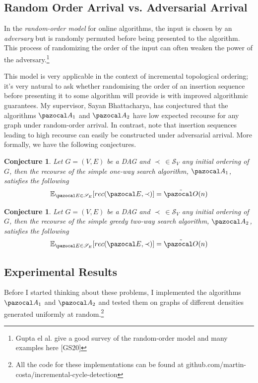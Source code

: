 \documentclass{report}
\newtheorem{conjecture}[theorem]{Conjecture}
\begin{document}
\subsection{Random Order Arrival vs. Adversarial Arrival}

In the \textit{random-order model} for online algorithms, the input is chosen by an \textit{adversary} but is randomly permuted before being presented to the algorithm. This process of randomizing the order of the input can often weaken the power of the adversary.\footnote{Gupta el al. give a good survey of the random-order model and many examples here [GS20]}

This model is very applicable in the context of incremental topological ordering; it's very natural to ask whether randomising the order of an insertion sequence before presenting it to some algorithm will provide is with improved algorithmic guarantees. My supervisor, Sayan Bhattacharya, has conjectured that the algorithms $\pazocal A_1$ and $\pazocal A_2$ have low expected recourse for any graph under random-order arrival. In contrast, note that insertion sequences leading to high recourse can easily be constructed under adversarial arrival. More formally, we have the following conjectures.

\begin{conjecture}
Let $G=(V,E)$ be a DAG and $\prec \: \in \mathcal S_V$ any initial ordering of $G$, then the recourse of the simple one-way search algorithm, $\pazocal A_1$, satisfies the following
\[ \mathbb E_{\pazocal E \in \mathcal S_E}[rec(\pazocal E, \prec)] = \tilde{\pazocal O} (n) \]
\end{conjecture}

\begin{conjecture}
Let $G=(V,E)$ be a DAG and $\prec \: \in \mathcal S_V$ any initial ordering of $G$, then the recourse of the simple greedy two-way search algorithm, $\pazocal A_2$, satisfies the following
\[ \mathbb E_{\pazocal E \in \mathcal S_E}[rec(\pazocal E, \prec)] = \tilde{\pazocal O} (n) \]
\end{conjecture}

\subsection{Experimental Results}

Before I started thinking about these problems, I implemented the algorithms $\pazocal A_1$ and $\pazocal A_2$ and tested them on graphs of different densities generated uniformly at random.\footnote{All the code for these implementations can be found at github.com/martin-costa/incremental-cycle-detection}
\end{document}
